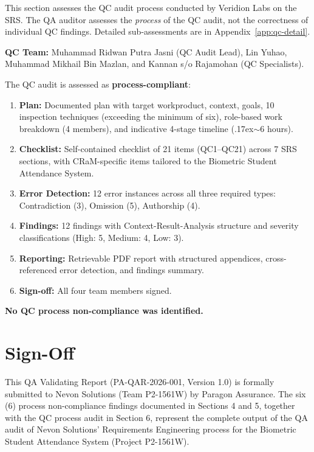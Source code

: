 \documentclass[11pt,a4paper]{article}
\begin{document}
This section assesses the QC audit process conducted by Veridion Labs on the SRS. The QA auditor assesses the \emph{process} of the QC audit, not the correctness of individual QC findings. Detailed sub-assessments are in Appendix~\ref{app:qc-detail}.

\textbf{QC Team:} Muhammad Ridwan Putra Jasni (QC Audit Lead), Lin Yuhao, Muhammad Mikhail Bin Mazlan, and Kannan s/o Rajamohan (QC Specialists).

The QC audit is assessed as \textbf{process-compliant}:

\begin{enumerate}
    \item \textbf{Plan:} Documented plan with target workproduct, context, goals, 10 inspection techniques (exceeding the minimum of six), role-based work breakdown (4 members), and indicative 4-stage timeline ({\raise.17ex\hbox{$\scriptstyle\sim$}}6 hours).
    \item \textbf{Checklist:} Self-contained checklist of 21 items (QC1--QC21) across 7 SRS sections, with CRaM-specific items tailored to the Biometric Student Attendance System.
    \item \textbf{Error Detection:} 12 error instances across all three required types: Contradiction (3), Omission (5), Authorship (4).
    \item \textbf{Findings:} 12 findings with Context-Result-Analysis structure and severity classifications (High: 5, Medium: 4, Low: 3).
    \item \textbf{Reporting:} Retrievable PDF report with structured appendices, cross-referenced error detection, and findings summary.
    \item \textbf{Sign-off:} All four team members signed.
\end{enumerate}

\textbf{No QC process non-compliance was identified.}

\section{Sign-Off}

This QA Validating Report (PA-QAR-2026-001, Version 1.0) is formally submitted to Nevon Solutions (Team P2-1561W) by Paragon Assurance. The six (6) process non-compliance findings documented in Sections 4 and 5, together with the QC process audit in Section 6, represent the complete output of the QA audit of Nevon Solutions' Requirements Engineering process for the Biometric Student Attendance System (Project P2-1561W).
\end{document}
